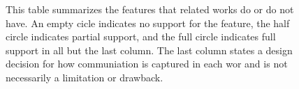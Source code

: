 \begin{figure}[H]
\centering 
\begin{table}[H]
\end{table}
\caption{This table summarizes the features that related works do or do not have. An empty cicle \emptycirc[0.5ex] indicates no support for the feature, the half circle \halfcircleft[0.5ex] indicates partial support, and the full circle \fullcirc[0.5ex] indicates full support in all but the last column. The last column states a design decision for how communiation is captured in each wor and is not necessarily a limitation or drawback.}
\label{fig:relatedworks}
\end{figure}

%

